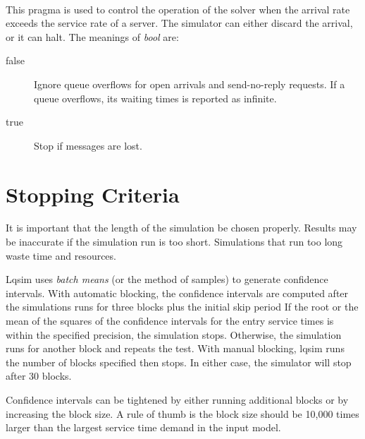 \begin{description}
\begin{description}
  \end{description}
\item[\optarg{stop-on-message-loss}{\emph{=bool}}] ~\\
  This pragma is used to control the operation of the solver when the
  arrival rate exceeds the service rate of a
  server.  The simulator can either discard the arrival, or it can
  halt.  The meanings of \emph{bool} are:
  \begin{description}
  \item[false] Ignore queue overflows for open
    arrivals and
    send-no-reply requests.  If a queue
    overflows, its waiting times is reported as
    infinite.
  \item[true] Stop if messages are lost.
  \end{description}
\end{description}

\section{Stopping Criteria}
\label{sec:stopping-criteria}

It is important that the length of the
simulation be chosen properly.  Results may
be inaccurate if the simulation run is too short.  Simulations that
run too long waste time and resources.

Lqsim uses \emph{batch means} (or the method of
samples) to generate confidence
intervals.  With automatic
blocking, the
confidence intervals are computed after the simulations runs for three
blocks plus the initial skip period If the root or
the mean of the squares of the confidence
intervals for the entry service times is
within the specified precision, the simulation stops.  Otherwise, the
simulation runs for another block and repeats the test.  With manual
blocking, lqsim runs the number of blocks
specified then stops.  In either case, the simulator will stop after
30 blocks.

Confidence intervals can be tightened by either running additional
blocks or by increasing the block size.  A rule of
thumb is the block size should be 10,000 times larger than the largest
service time demand in the input model.

